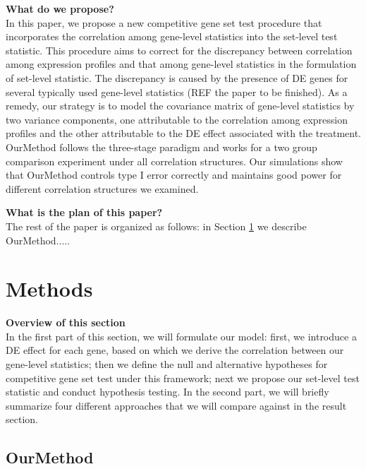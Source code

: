 \documentclass[11pt, a4paper]{article}
\begin{document}
	   
	
	\textbf{What do we propose?} \\
	In this paper, we propose a new competitive gene set test procedure that incorporates the correlation among gene-level statistics into the set-level test statistic. This procedure aims to correct for the discrepancy between correlation among expression profiles and that among gene-level statistics in the formulation of set-level statistic. The discrepancy is caused by the presence of DE genes for several typically used gene-level statistics (REF the paper to be finished). As a remedy, our strategy is to model the covariance matrix of gene-level statistics by two variance components, one attributable to the correlation among expression profiles and the other attributable to the DE effect associated with the treatment. OurMethod follows the three-stage paradigm and works for a two group comparison experiment under all correlation structures. Our simulations show that OurMethod controls type I error correctly and maintains good power for different correlation structures we examined. 
		
	\textbf{What is the plan of this paper?} \\
	The rest of the paper is organized as follows: in Section \ref{section:methods} we describe OurMethod.....
	
	
	
	\section{Methods}\label{section:methods}
	\textbf{Overview of this section} \\
	In the first part of this section, we will formulate our model: first, we introduce a DE effect for each gene, based on which we derive the correlation between our gene-level statistics; then we define the null and alternative hypotheses for competitive gene set test under this framework; next we propose our set-level test statistic and conduct hypothesis testing. In the second part, we will briefly summarize four different approaches that we will compare against in the result section.  
	
	\subsection{OurMethod}
\end{document}
